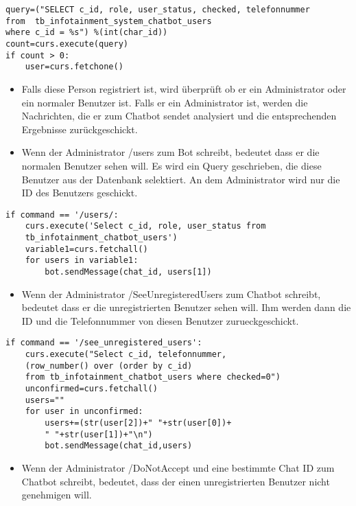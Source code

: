 \begin{lstlisting}[frame=single]
query=("SELECT c_id, role, user_status, checked, telefonnummer 
from  tb_infotainment_system_chatbot_users 
where c_id = %s") %(int(char_id))
count=curs.execute(query)
if count > 0:
	user=curs.fetchone()
\end{lstlisting}
\begin{itemize}
	\item Falls diese Person registriert ist, wird überprüft ob er ein Administrator oder ein normaler Benutzer ist. Falls er ein Administrator ist, werden die Nachrichten, die er zum Chatbot sendet analysiert und die entsprechenden Ergebnisse zurückgeschickt. 
\end{itemize}	
\begin{itemize}
	\item Wenn der Administrator /users zum Bot schreibt, bedeutet dass er die normalen Benutzer sehen will. Es wird ein Query geschrieben, die diese Benutzer aus der Datenbank selektiert. An dem Administrator wird nur die ID des Benutzers geschickt.
\end{itemize}
\newpage
\begin{lstlisting}[frame=single]
if command == '/users/:
	curs.execute('Select c_id, role, user_status from 
	tb_infotainment_chatbot_users')
	variable1=curs.fetchall()
	for users in variable1:
		bot.sendMessage(chat_id, users[1])
\end{lstlisting}
\begin{itemize}
	\item Wenn der Administrator /SeeUnregisteredUsers zum Chatbot schreibt, bedeutet dass er die unregistrierten Benutzer sehen will. Ihm werden dann die ID und die Telefonnummer von diesen Benutzer zurueckgeschickt. 
\end{itemize}
\begin{lstlisting}[frame=single]
if command == '/see_unregistered_users':
	curs.execute("Select c_id, telefonnummer,
	(row_number() over (order by c_id) 
	from tb_infotainment_chatbot_users where checked=0")
	unconfirmed=curs.fetchall()
	users=""
	for user in unconfirmed:
		users+=(str(user[2])+" "+str(user[0])+
		" "+str(user[1])+"\n")
		bot.sendMessage(chat_id,users)
\end{lstlisting}
\begin{itemize}
	\item Wenn der Administrator /DoNotAccept und eine bestimmte Chat ID zum Chatbot schreibt, bedeutet, dass der einen unregistrierten Benutzer nicht genehmigen will. 
\end{itemize}	
